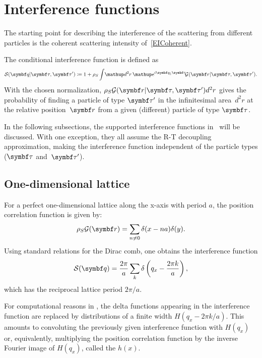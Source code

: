 \section{Interference functions}

The starting point for describing the interference of the scattering from different
particles is the coherent scattering intensity of~\cref{EICoherent}.

The conditional interference function is defined as
\begin{equation}
  \SD(\q |\v\tau,\v\tau')
  \coloneqq 1 + \rho_S \int\!\d^2r\, \e^{i\q_\plll\r}\! \GD(\r|\v\tau,\v\tau').
\end{equation}
With the chosen normalization, $\rho_S \GD(\r|\v\tau,\v\tau') d^2r$ gives the probability of
finding a particle of type $\v\tau'$ in the infinitesimal area~$d^2r$
at the relative position~$\r$ from
a given (different) particle of type $\v\tau$.

In the following subsections,
the supported interference functions in \BornAgain\ will be discussed.
With one exception,
they all assume the R-T decoupling approximation, making the interference function
independent of the particle types ($\v\tau$ and~$\v\tau'$).

\subsection{One-dimensional lattice} \label{sec:sect:1dlattice}

For a perfect one-dimensional lattice along the x-axis with period $a$, the position
correlation function is given by:
\begin{equation}
  \rho_S\GD(\r) = \sum_{n\neq 0} \delta(x-na)\delta(y).
\end{equation}
Using standard relations for the Dirac comb,
one obtains the interference function
\begin{equation}
 \SD(\q) = \frac{2\pi}{a}\sum_k \delta\left(q_x - \frac{2\pi k}{a}\right),
\end{equation}
which has the reciprocal lattice period $2\pi/a$.

For computational reasons in \BornAgain, the delta functions appearing in the interference function
are replaced by distributions of a finite width $H(q_x-2\pi k/a)$. This amounts to convoluting the
previously given interference function with $H(q_x)$ or, equivalently, multiplying
the position correlation function by the inverse Fourier image of $H(q_x)$, called the
 $h(x)$.

